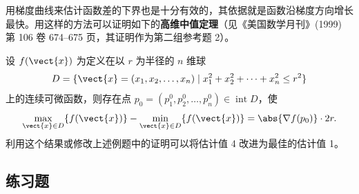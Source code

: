 \begin{xremark}
用梯度曲线来估计函数差的下界也是十分有效的，其依据就是函数沿梯度方向增长最快。用这样的方法可以证明如下的\textbf{高维中值定理}（见《美国数学月刊》(1999) 第 106 卷 674--675 页，其证明作为第二组参考题 2）。

设 $f(\vect{x})$ 为定义在以 $r$ 为半径的 $n$ 维球
\[
  D=\{\vect{x}=(x_1,x_2,\ldots,x_n)\mid x_1^2+x_2^2+\cdots+x_n^2\le r^2\}
\]
上的连续可微函数，则存在点 $p_0=(p_1^0,p_2^0,\ldots,p_n^0)\in\operatorname{int}D$，使
\[
  \max_{\vect{x}\in D}\{f(\vect{x})\}-\min_{\vect{x}\in D}\{f(\vect{x})\}=\abs{\nabla f(p_0)}\cdot2r.
\]
利用这个结果或修改上述例题中的证明可以将估计值 4 改进为最佳的估计值 1。
\end{xremark}

\subsection{练习题}

